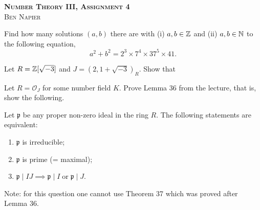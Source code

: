 \documentclass[a4paper, answers]{exam}
\begin{document}
\begin{center}
	\textbf{\textsc{Number Theory III, Assignment 4}}
	\\
	\textsc{Ben Napier}
	\vspace{1em}
\end{center}

\begin{questions}
	\question
	Find how many solutions $(a,b)$ there are with (i) $a,b \in \mathbb{Z}$ and
	(ii) $a,b \in \mathbb{N}$ to the following equation,
	\[
		a^2 + b^2 = 2^3 \times 7^4 \times 37^5 \times 41.
	\]
	
	\question
	Let $R = \mathbb{Z}[\sqrt{-3}]$ and $J = (2, 1 + \sqrt{-3})_R$.
	Show that

	\question
	Let $R = \mathcal O_J$ for some number field $K$.
	Prove Lemma 36 from the lecture, that is, show the following.

	Let $\mathfrak p$ be any proper non-zero ideal in the ring $R$.
	The following statements are equivalent:
	\begin{enumerate}
		\item $\mathfrak p$ is irreducible;
		\item $\mathfrak p$ is prime (= maximal);
		\item $\mathfrak p \mid IJ \implies 
			\mathfrak p \mid I \;\text{or}\; \mathfrak p \mid J$.
	\end{enumerate}

	Note: for this question one cannot use Theorem 37 which was proved after
	Lemma 36.
\end{questions}
\end{document}
